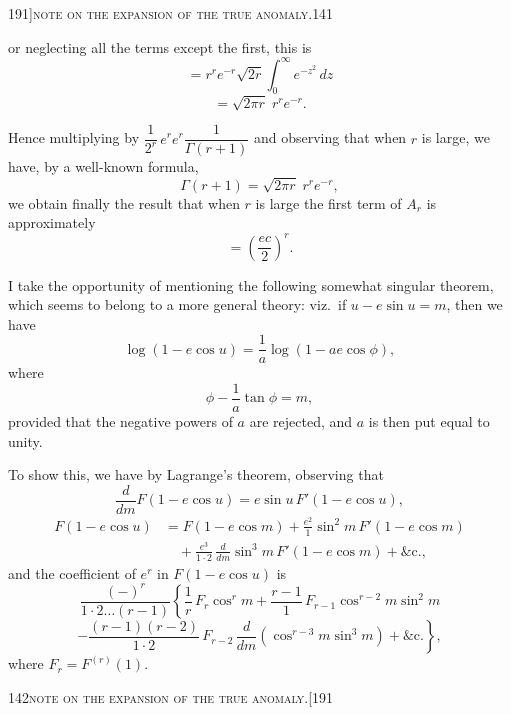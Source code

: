 \documentclass[11pt]{article}
\begin{document}
\begin{center}\small 191]\hfill\textsc{note on the expansion of the true anomaly.}\hfill 141\end{center}

\medskip

\noindent or neglecting all the terms except the first, this is
\[
= r^{r} e^{-r} \sqrt{2r} \int_{0}^{\infty} e^{-z^{2}}\, dz
\]
\[
= \sqrt{2\pi r}\; r^{r} e^{-r}.
\]

Hence multiplying by $\dfrac{1}{2^{r}}\, e^{r} e^{r} \dfrac{1}{\Gamma(r+1)}$ and observing that when $r$ is large, we have, by a well-known formula,
\[
\Gamma(r+1) = \sqrt{2\pi r}\; r^{r} e^{-r},
\]
we obtain finally the result that when $r$ is large the first term of $A_{r}$ is approximately
\[
= \left(\frac{ec}{2}\right)^{r}.
\]

I take the opportunity of mentioning the following somewhat singular theorem, which seems to belong to a more general theory: viz.\ if $u - e\sin u = m$, then we have
\[
\log(1 - e\cos u) = \frac{1}{a}\log(1 - ae\cos \phi),
\]
where
\[
\phi - \frac{1}{a}\tan\phi = m,
\]
provided that the negative powers of $a$ are rejected, and $a$ is then put equal to unity.

To show this, we have by Lagrange's theorem, observing that
\[
\frac{d}{dm} F(1 - e\cos u) = e\sin u\, F'(1 - e\cos u),
\]
\begin{align*}
F(1 - e\cos u) &= F(1 - e\cos m) + \frac{e^{2}}{1}\sin^{2} m\, F'(1 - e\cos m) \\
&\quad + \frac{e^{3}}{1\cdot 2}\, \frac{d}{dm}\sin^{3} m\, F'(1 - e\cos m) + \&\text{c.,}
\end{align*}
and the coefficient of $e^{r}$ in $F(1 - e\cos u)$ is
\[
\frac{(-)^{r}}{1\cdot 2\dots (r-1)}\left\{ \frac{1}{r}\, F_{r}\cos^{r} m + \frac{r-1}{1}\, F_{r-1}\cos^{r-2} m\sin^{2} m \right.
\]
\[
\left. - \frac{(r-1)(r-2)}{1\cdot 2}\, F_{r-2}\, \frac{d}{dm}(\cos^{r-3} m\sin^{3} m) + \&\text{c.} \right\},
\]
where $F_{r} = F^{(r)}(1)$.

\bigskip

\begin{center}\small 142\hfill\textsc{note on the expansion of the true anomaly.}\hfill [191\end{center}

\medskip
\end{document}
